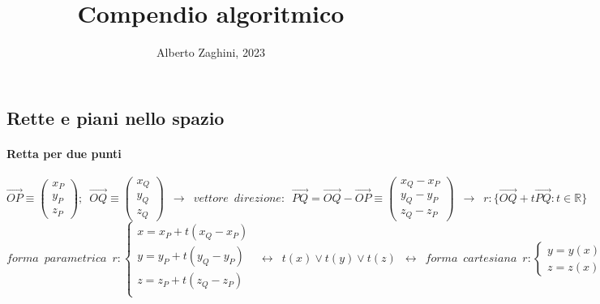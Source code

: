 \documentclass[10pt]{article}
\title{Compendio algoritmico}
\author{Alberto Zaghini, 2023}
\date{}
\theoremstyle{plain}
\begin{document}
\maketitle
\small
\thispagestyle{empty}
\subsection*{Rette e piani nello spazio}

\paragraph{Retta per due punti} 
\[\Vec{OP} \equiv \begin{pmatrix}
    x_P\\ y_P \\ z_P
\end{pmatrix}; \enspace \Vec{OQ} \equiv \begin{pmatrix}
    x_Q\\ y_Q \\ z_Q
\end{pmatrix} \enspace \rightarrow \enspace vettore \enspace direzione: \enspace \Vec{PQ} = \Vec{OQ} - \Vec{OP} \equiv \begin{pmatrix}
    x_Q - x_P\\ y_Q - y_P \\ z_Q - z_P
\end{pmatrix} \enspace \rightarrow \enspace r: \{\Vec{OQ} + t \Vec{PQ} : t \in \mathbb{R}\}\]
\[forma \enspace parametrica \enspace r: \begin{cases}
    x = x_P + t (x_Q - x_P)\\
    y = y_P + t (y_Q - y_P)\\
    z = z_P + t (z_Q - z_P)\\
\end{cases} \enspace \longleftrightarrow \enspace t(x) \lor t(y) \lor t(z) \enspace \longleftrightarrow \enspace forma \enspace cartesiana \enspace r: \begin{cases}
    y = y (x)\\
    z = z (x)
\end{cases}\]
\end{document}
